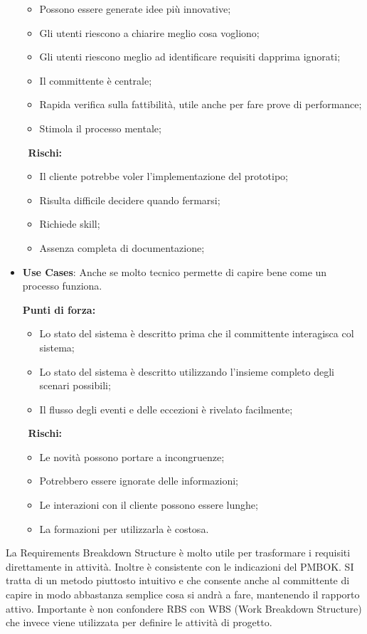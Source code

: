 \begin{itemize}
\begin{info}[]
\begin{itemize}
			\item Possono essere generate idee più innovative;
			\item Gli utenti riescono a chiarire meglio cosa vogliono;
			\item Gli utenti riescono meglio ad identificare requisiti dapprima ignorati;
			\item Il committente è centrale;
			\item Rapida verifica sulla fattibilità, utile anche per fare prove di performance;
			\item Stimola il processo mentale;
		\end{itemize}
		$\;\;$\textbf{Rischi:}
		\begin{itemize}
			\item Il cliente potrebbe voler l'implementazione del prototipo;
			\item Risulta difficile decidere quando fermarsi;
			\item Richiede skill;
			\item Assenza completa di documentazione;
		\end{itemize}
	\end{info}
	\item \textbf{Use Cases}: Anche se molto tecnico permette di capire bene come un processo funziona.
	\begin{info}[]
		\textbf{Punti di forza:}
		\begin{itemize}
			\item Lo stato del sistema è descritto prima che il committente interagisca col sistema;
			\item Lo stato del sistema è descritto utilizzando l'insieme completo degli scenari possibili;
			\item Il flusso degli eventi e delle eccezioni è rivelato facilmente;
		\end{itemize}
		$\;\;$\textbf{Rischi:}
		\begin{itemize}
			\item Le novità possono portare a incongruenze;
			\item Potrebbero essere ignorate delle informazioni;
			\item Le interazioni con il cliente possono essere lunghe;
			\item La formazioni per utilizzarla è costosa.
		\end{itemize}
	\end{info}
\end{itemize}
La Requirements Breakdown Structure è molto utile per trasformare i requisiti direttamente in attività. Inoltre è consistente con le indicazioni del PMBOK. SI tratta di un metodo piuttosto intuitivo e che consente anche al committente di capire in modo abbastanza semplice cosa si andrà a fare, mantenendo il rapporto attivo. Importante è non confondere RBS con WBS (Work Breakdown Structure) che invece viene utilizzata per definire le attività di progetto.\newline
